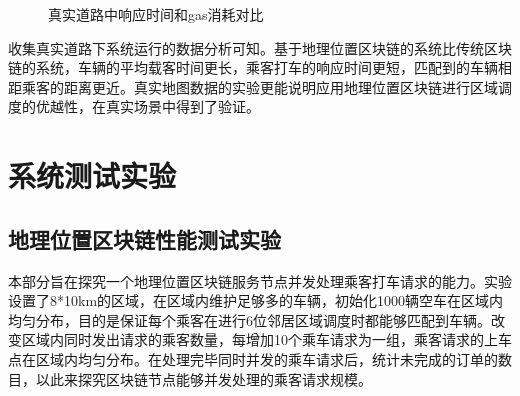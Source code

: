 \begin{figure}[h]
  \centering
  \caption{真实道路中响应时间和gas消耗对比}
  \label{fig:real_manageGas}
\end{figure}

收集真实道路下系统运行的数据分析可知。基于地理位置区块链的系统比传统区块链的系统，车辆的平均载客时间更长，乘客打车的响应时间更短，匹配到的车辆相距乘客的距离更近。真实地图数据的实验更能说明应用地理位置区块链进行区域调度的优越性，在真实场景中得到了验证。

\section{系统测试实验}
\subsection{地理位置区块链性能测试实验}
本部分旨在探究一个地理位置区块链服务节点并发处理乘客打车请求的能力。实验设置了8*10km的区域，在区域内维护足够多的车辆，初始化1000辆空车在区域内均匀分布，目的是保证每个乘客在进行6位邻居区域调度时都能够匹配到车辆。改变区域内同时发出请求的乘客数量，每增加10个乘车请求为一组，乘客请求的上车点在区域内均匀分布。在处理完毕同时并发的乘车请求后，统计未完成的订单的数目，以此来探究区块链节点能够并发处理的乘客请求规模。

